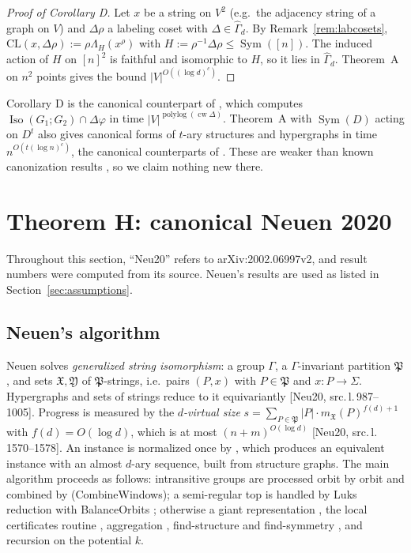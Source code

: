 \documentclass[11pt]{article}
\theoremstyle{plain}
\theoremstyle{definition}
\theoremstyle{remark}
\theoremstyle{named}
\theoremstyle{namedrm}
\newcommand{\status}[1]{\par\smallskip\noindent
  \fbox{\parbox{\dimexpr\linewidth-2\fboxsep-2\fboxrule\relax}{\small\textbf{Status.} #1}}\par\smallskip}
\newcommand{\Sym}{\operatorname{Sym}}
\newcommand{\Iso}{\operatorname{Iso}}
\newcommand{\cw}{\operatorname{cw}}
\newcommand{\polylog}{\operatorname{polylog}}
\newcommand{\Gd}{\widehat{\Gamma}_d}
\newcommand{\fX}{\mathfrak{X}}
\newcommand{\fP}{\mathfrak{P}}
\newcommand{\src}[2]{[#1, src.\,l.\,#2]}
\begin{document}
\begin{proof}[Proof of Corollary D]
Let $x$ be a string on $V^2$ (e.g.\ the adjacency string of a graph on $V$) and $\Delta\rho$ a labeling coset with
$\Delta\in\Gd$. By Remark~\ref{rem:labcosets}, $\mathrm{CL}(x,\Delta\rho):=\rho\Lambda_H(x^\rho)$ with
$H:=\rho^{-1}\Delta\rho\le\Sym([n])$. The induced action of $H$ on $[n]^2$ is faithful and isomorphic to $H$, so it
lies in $\Gd$. Theorem~A on $n^2$ points gives the bound $|V|^{O((\log d)^c)}$.
\end{proof}
\status{Proof modulo Theorem A.}

Corollary D is the canonical counterpart of \cite[Thm.~31]{Wie20}, which computes
$\Iso(G_1;G_2)\cap\Delta\varphi$ in time $|V|^{\polylog(\cw\Delta)}$. Theorem~A with $\Sym(D)$ acting on $D^t$ also
gives canonical forms of $t$-ary structures and hypergraphs in time $n^{O(t(\log n)^c)}$, the canonical
counterparts of \cite[Thm.~8.3, Cor.~8.4]{GNS}. These are weaker than known canonization results
\cite[Thms.~5.2, 5.4]{Wie21}, so we claim nothing new there.

\section{Theorem H: canonical Neuen 2020}\label{sec:H}

Throughout this section, ``Neu20'' refers to arXiv:2002.06997v2, and result numbers were computed from its
source. Neuen's results are used as listed in Section~\ref{sec:assumptions}.

\subsection{Neuen's algorithm}

Neuen solves \emph{generalized string isomorphism}: a group $\Gamma$, a $\Gamma$-invariant partition $\fP$, and
sets $\fX,\mathfrak Y$ of $\fP$-strings, i.e.\ pairs $(P,x)$ with $P\in\fP$ and $x\colon P\to\Sigma$. Hypergraphs and
sets of strings reduce to it equivariantly \src{Neu20}{987--1005}. Progress is measured by the
\emph{$d$-virtual size} $s=\sum_{P\in\fP}|P|\cdot m_{\fX}(P)^{f(d)+1}$ with $f(d)=O(\log d)$, which is at most
$(n+m)^{O(\log d)}$ \src{Neu20}{1570--1578}. An instance is normalized once by
\cite[Thm.~4.8]{Neu20}, which produces an equivalent instance with an almost $d$-ary sequence, built from
structure graphs. The main algorithm \cite[Lemma~4.36, Thm.~4.37]{Neu20} proceeds as follows:
intransitive groups are processed orbit by orbit and combined by \cite[Lemma~4.15]{Neu20}
(CombineWindows); a semi-regular top is handled by Luks reduction with BalanceOrbits
\cite[Lemma~4.3]{Neu20}; otherwise a giant representation \cite[Lemma~4.35]{Neu20}, the local
certificates routine \cite[Thm.~4.24]{Neu20}, aggregation \cite[Lemma~4.29]{Neu20}, find-structure and
find-symmetry \cite[Lemmas~4.33, 4.34]{Neu20}, and recursion on the potential $k$.
\end{document}
